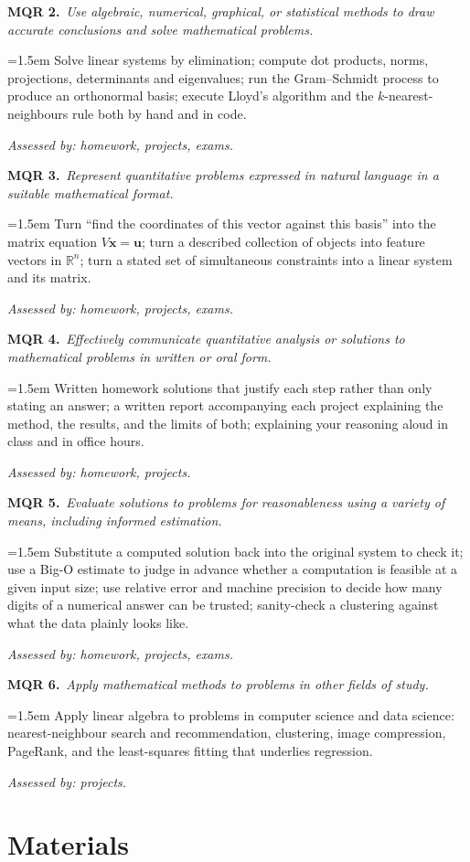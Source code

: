 \documentclass[11pt]{article}
\newcommand{\mqr}[4]{%
  \par\medskip\needspace{4\baselineskip}%
  {\bfseries\color{accent}MQR #1.}\ \emph{#2}\par\nobreak\vspace{0.2em}
  \begingroup\leftskip=1.5em\relax
  #3\par\nobreak\vspace{0.15em}
  {\footnotesize\itshape Assessed by: #4.}\par
  \endgroup}
\begin{document}
\mqr{2}{Use algebraic, numerical, graphical, or statistical methods to draw
  accurate conclusions and solve mathematical problems.}
 {Solve linear systems by elimination; compute dot products, norms,
  projections, determinants and eigenvalues; run the Gram--Schmidt process to
  produce an orthonormal basis; execute Lloyd's algorithm and the
  $k$-nearest-neighbours rule both by hand and in code.}
 {homework, projects, exams}

\mqr{3}{Represent quantitative problems expressed in natural language in a
  suitable mathematical format.}
 {Turn ``find the coordinates of this vector against this basis'' into the
  matrix equation $V\mathbf{x}=\mathbf{u}$; turn a described collection of
  objects into feature vectors in $\mathbb{R}^{n}$; turn a stated set of
  simultaneous constraints into a linear system and its matrix.}
 {homework, projects, exams}

\mqr{4}{Effectively communicate quantitative analysis or solutions to
  mathematical problems in written or oral form.}
 {Written homework solutions that justify each step rather than only stating an
  answer; a written report accompanying each project explaining the method, the
  results, and the limits of both; explaining your reasoning aloud in class and
  in office hours.}
 {homework, projects}

\mqr{5}{Evaluate solutions to problems for reasonableness using a variety of
  means, including informed estimation.}
 {Substitute a computed solution back into the original system to check it; use
  a Big-O estimate to judge in advance whether a computation is feasible at a
  given input size; use relative error and machine precision to decide how many
  digits of a numerical answer can be trusted; sanity-check a clustering
  against what the data plainly looks like.}
 {homework, projects, exams}

\mqr{6}{Apply mathematical methods to problems in other fields of study.}
 {Apply linear algebra to problems in computer science and data science:
  nearest-neighbour search and recommendation, clustering, image compression,
  PageRank, and the least-squares fitting that underlies regression.}
 {projects}

\section{Materials}
\end{document}
